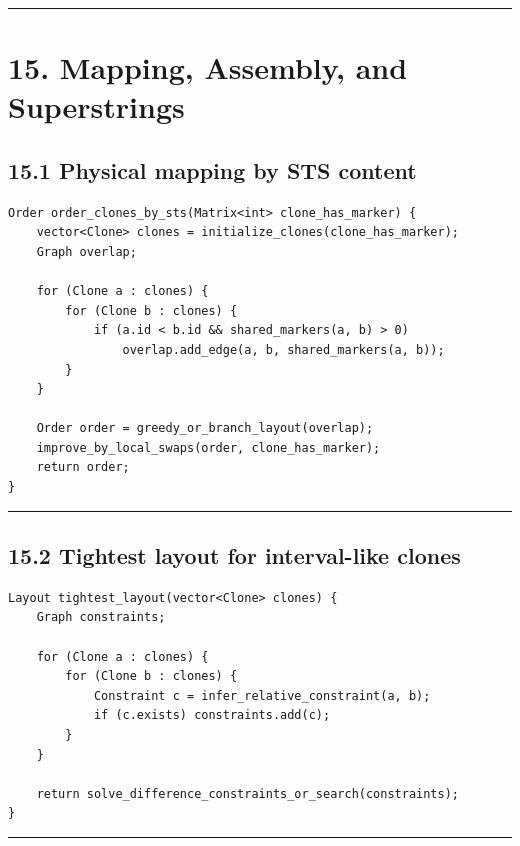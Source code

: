 \documentclass[11pt]{article}
\begin{document}
\begin{center}\rule{0.5\linewidth}{0.5pt}\end{center}

\section{15. Mapping, Assembly, and Superstrings}\label{mapping-assembly-and-superstrings}

\subsection{15.1 Physical mapping by STS content}\label{physical-mapping-by-sts-content}

\begin{verbatim}
Order order_clones_by_sts(Matrix<int> clone_has_marker) {
    vector<Clone> clones = initialize_clones(clone_has_marker);
    Graph overlap;

    for (Clone a : clones) {
        for (Clone b : clones) {
            if (a.id < b.id && shared_markers(a, b) > 0)
                overlap.add_edge(a, b, shared_markers(a, b));
        }
    }

    Order order = greedy_or_branch_layout(overlap);
    improve_by_local_swaps(order, clone_has_marker);
    return order;
}
\end{verbatim}

\begin{center}\rule{0.5\linewidth}{0.5pt}\end{center}

\subsection{15.2 Tightest layout for interval-like clones}\label{tightest-layout-for-interval-like-clones}

\begin{verbatim}
Layout tightest_layout(vector<Clone> clones) {
    Graph constraints;

    for (Clone a : clones) {
        for (Clone b : clones) {
            Constraint c = infer_relative_constraint(a, b);
            if (c.exists) constraints.add(c);
        }
    }

    return solve_difference_constraints_or_search(constraints);
}
\end{verbatim}

\begin{center}\rule{0.5\linewidth}{0.5pt}\end{center}
\end{document}
